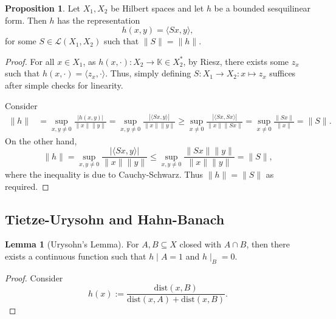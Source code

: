 \documentclass[]{article}
\theoremstyle{definition}
\theoremstyle{definition}
\newtheorem{lemma}{Lemma}[section]
\newtheorem{proposition}{Proposition}[section]
\begin{document}
\begin{proposition}
  Let \(X_1, X_2\) be Hilbert spaces and let \(h\) be a bounded sesquilinear 
  form. Then \(h\) has the representation 
  \[h(x, y) = \langle Sx, y \rangle,\]
  for some \(S \in \mathcal{L}(X_1, X_2)\) such that \(\|S\| = \|h\|\).
\end{proposition}
\begin{proof}
  For all \(x \in X_1\), as \(h(x, \cdot) : X_2 \to \mathbb{K} \in X_2^*\), 
  by Riesz, there exists some \(z_x\) such that \(h(x, \cdot) = 
  \langle z_x, \cdot \rangle\). Thus, simply defining 
  \(S : X_1 \to X_2 : x \mapsto z_x\) suffices after simple checks for linearity.

  Consider 
  \[\begin{split}
    \|h\| & = \sup_{x, y \neq 0} \frac{|h(x, y)|}{\|x\|\|y\|} 
      = \sup_{x, y \neq 0} \frac{|\langle Sx, y \rangle|}{\|x\|\|y\|}
      \ge \sup_{x \neq 0} \frac{|\langle Sx, Sx \rangle|}{\|x\|\|Sx\|}
      = \sup_{x \neq 0} \frac{\|Sx\|}{\|x\|} = \|S\|.
  \end{split}\]
  On the other hand, 
  \[\|h\| = \sup_{x, y \neq 0} \frac{|\langle Sx, y \rangle|}{\|x\|\|y\|}
    \le \sup_{x, y \neq 0} \frac{\|Sx\|\|y\|}{\|x\|\|y\|} = \|S\|,\]
  where the inequality is due to Cauchy-Schwarz. Thus \(\|h\| = \|S\|\) as 
  required.
\end{proof}

\subsection{Tietze-Urysohn and Hahn-Banach}

\begin{lemma}[Urysohn's Lemma]
  For \(A, B \subseteq X\) closed with \(A \cap B\), then there exists a continuous 
  function such that \(h\mid A = 1\) and \(h\mid_B = 0\).
\end{lemma}
\begin{proof}
  Consider 
  \[h(x) := \frac{\text{dist}(x, B)}{\text{dist}(x, A) + \text{dist}(x, B)}.\]
\end{proof}
\end{document}
